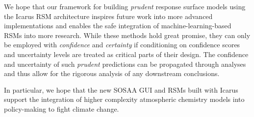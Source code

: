 \newpar We hope that our framework for building \textit{prudent} response surface models using the Icarus RSM architecture inspires future work into more advanced implementations and enables the safe integration of machine-learning-based RSMs into more research. While these methods hold great promise, they can only be employed with \textit{confidence} and \textit{certainty} if conditioning on confidence scores and uncertainty levels are treated as critical parts of their design. The confidence and uncertainty of such \textit{prudent} predictions can be propagated through analyses and thus allow for the rigorous analysis of any downstream conclusions.

In particular, we hope that the new SOSAA GUI and RSMs built with Icarus support the integration of higher complexity atmospheric chemistry models into policy-making to fight climate change.
